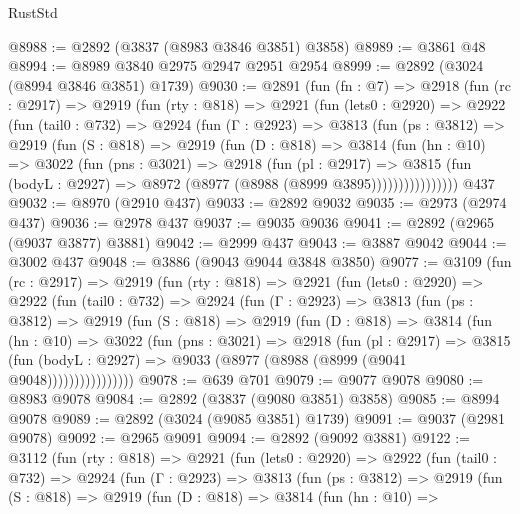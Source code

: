 \begin{lexlean}{RustStd}
\begin{coremodule}
@8988 := @2892 (@3837 (@8983 @3846 @3851) @3858)
@8989 := @3861 @48
@8994 := @8989 @3840 @2975 @2947 @2951 @2954
@8999 := @2892 (@3024 (@8994 @3846 @3851) @1739)
@9030 := @2891
    (fun (fn : @7) =>
    @2918
      (fun (rc : @2917) =>
      @2919
        (fun (rty : @818) =>
        @2921
          (fun (lets0 : @2920) =>
          @2922
            (fun (tail0 : @732) =>
            @2924
              (fun (Γ : @2923) =>
              @3813
                (fun (ps : @3812) =>
                @2919
                  (fun (S : @818) =>
                  @2919
                    (fun (D : @818) =>
                    @3814
                      (fun (hn : @10) =>
                      @3022
                        (fun (pns : @3021) =>
                        @2918
                          (fun (pl : @2917) =>
                          @3815
                            (fun (bodyL : @2927) => @8972 (@8977 (@8988 (@8999 @3895))))))))))))))))
    @437
@9032 := @8970 (@2910 @437)
@9033 := @2892 @9032
@9035 := @2973 (@2974 @437)
@9036 := @2978 @437
@9037 := @9035 @9036
@9041 := @2892 (@2965 (@9037 @3877) @3881)
@9042 := @2999 @437
@9043 := @3887 @9042
@9044 := @3002 @437
@9048 := @3886 (@9043 @9044 @3848 @3850)
@9077 := @3109
    (fun (rc : @2917) =>
    @2919
      (fun (rty : @818) =>
      @2921
        (fun (lets0 : @2920) =>
        @2922
          (fun (tail0 : @732) =>
          @2924
            (fun (Γ : @2923) =>
            @3813
              (fun (ps : @3812) =>
              @2919
                (fun (S : @818) =>
                @2919
                  (fun (D : @818) =>
                  @3814
                    (fun (hn : @10) =>
                    @3022
                      (fun (pns : @3021) =>
                      @2918
                        (fun (pl : @2917) =>
                        @3815
                          (fun (bodyL : @2927) =>
                          @9033 (@8977 (@8988 (@8999 (@9041 @9048))))))))))))))))
@9078 := @639 @701
@9079 := @9077 @9078
@9080 := @8983 @9078
@9084 := @2892 (@3837 (@9080 @3851) @3858)
@9085 := @8994 @9078
@9089 := @2892 (@3024 (@9085 @3851) @1739)
@9091 := @9037 (@2981 @9078)
@9092 := @2965 @9091
@9094 := @2892 (@9092 @3881)
@9122 := @3112
    (fun (rty : @818) =>
    @2921
      (fun (lets0 : @2920) =>
      @2922
        (fun (tail0 : @732) =>
        @2924
          (fun (Γ : @2923) =>
          @3813
            (fun (ps : @3812) =>
            @2919
              (fun (S : @818) =>
              @2919
                (fun (D : @818) =>
                @3814
                  (fun (hn : @10) =>

\end{coremodule}
\end{lexlean}
